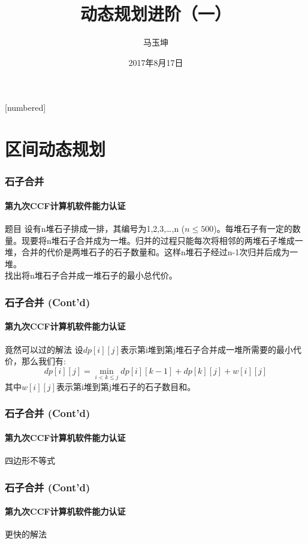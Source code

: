 \documentclass[hyperref={unicode=true}]{beamer}
\begin{document}
[numbered]
\renewcommand\figurename{图}
\renewcommand\tablename{表}
\renewcommand\contentsname{\centering 目录}

\title{动态规划进阶（一）}
\subtitle{}
\author{马玉坤}
\date{2017年8月17日}

\begin{frame}\titlepage\end{frame}

  \section{区间动态规划}
  \begin{frame}\frametitle{石子合并}
    \framesubtitle{第九次CCF计算机软件能力认证}
    \begin{block}{题目}
      设有n堆石子排成一排，其编号为1,2,3,…,n ($n\leq500$)。每堆石子有一定的数量。现要将n堆石子合并成为一堆。归并的过程只能每次将相邻的两堆石子堆成一堆，合并的代价是两堆石子的石子数量和。这样n堆石子经过n-1次归并后成为一堆。\\
      找出将n堆石子合并成一堆石子的最小总代价。
    \end{block}
  \end{frame}

  \begin{frame}\frametitle{石子合并 (Cont'd)}
    \framesubtitle{第九次CCF计算机软件能力认证}
    \begin{exampleblock}{竟然可以过的解法}
      设$dp[i][j]$表示第i堆到第j堆石子合并成一堆所需要的最小代价，那么我们有:
      \[dp[i][j] = \min_{i < k \leq j}dp[i][k-1] + dp[k][j] + w[i][j]\]
      其中$w[i][j]$表示第i堆到第j堆石子的石子数目和。
    \end{exampleblock}
  \end{frame}

  \begin{frame}\frametitle{石子合并 (Cont'd)}
    \framesubtitle{第九次CCF计算机软件能力认证}
    \begin{alertblock}{四边形不等式}
    \end{alertblock}
  \end{frame}
  \begin{frame}\frametitle{石子合并 (Cont'd)}
    \framesubtitle{第九次CCF计算机软件能力认证}
    \begin{exampleblock}{更快的解法}
    \end{exampleblock}
  \end{frame}
\end{document}
